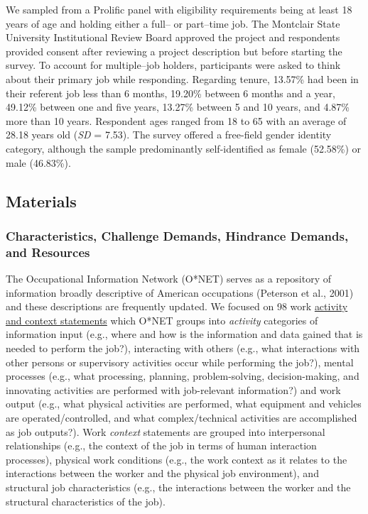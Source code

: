 \documentclass[
  man]{apa7}
\begin{document}
We sampled from a Prolific panel with eligibility requirements being at least 18 years of age and holding either a full-- or part--time job. The Montclair State University Institutional Review Board approved the project and respondents provided consent after reviewing a project description but before starting the survey. To account for multiple--job holders, participants were asked to think about their primary job while responding. Regarding tenure, 13.57\% had been in their referent job less than 6 months, 19.20\% between 6 months and a year, 49.12\% between one and five years, 13.27\% between 5 and 10 years, and 4.87\% more than 10 years. Respondent ages ranged from 18 to 65 with an average of 28.18 years old (\emph{SD} = 7.53). The survey offered a free-field gender identity category, although the sample predominantly self-identified as female (52.58\%) or male (46.83\%).

\subsection{Materials}\label{materials}

\subsubsection{Characteristics, Challenge Demands, Hindrance Demands, and Resources}\label{characteristics-challenge-demands-hindrance-demands-and-resources}

The Occupational Information Network (O*NET) serves as a repository of information broadly descriptive of American occupations (Peterson et al., 2001) and these descriptions are frequently updated. We focused on 98 work \href{https://www.ONETonline.org/find/descriptor/result/4.A.1.b.3}{activity and context statements} which O*NET groups into \emph{activity} categories of information input (e.g., where and how is the information and data gained that is needed to perform the job?), interacting with others (e.g., what interactions with other persons or supervisory activities occur while performing the job?), mental processes (e.g., what processing, planning, problem-solving, decision-making, and innovating activities are performed with job-relevant information?) and work output (e.g., what physical activities are performed, what equipment and vehicles are operated/controlled, and what complex/technical activities are accomplished as job outputs?). Work \emph{context} statements are grouped into interpersonal relationships (e.g., the context of the job in terms of human interaction processes), physical work conditions (e.g., the work context as it relates to the interactions between the worker and the physical job environment), and structural job characteristics (e.g., the interactions between the worker and the structural characteristics of the job).
\end{document}
